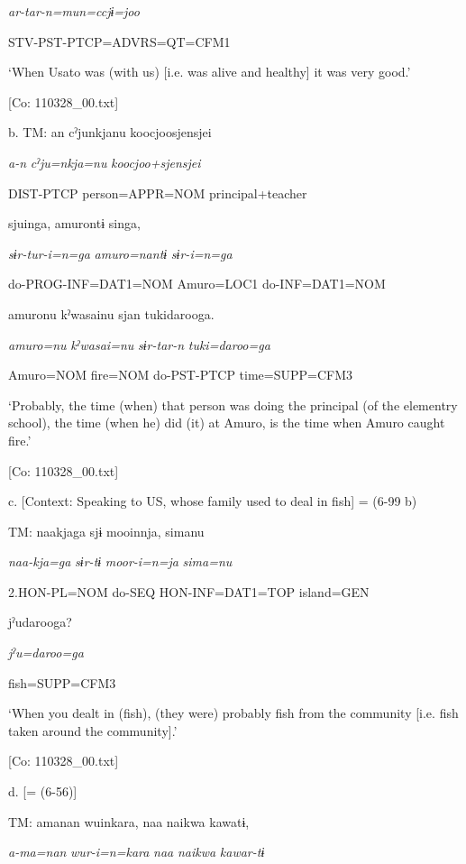       \textit{ar-tar-n=mun=ccjɨ=joo}

      STV-PST-PTCP=ADVRS=QT=CFM1

      ‘When Usato was (with us) [i.e. was alive and healthy] it was very good.’

      [Co: 110328\_00.txt]

  b.  TM:  an  cˀjunkjanu  {\textbar}koocjoosjensjei{\textbar}

      \textit{a-n}  \textit{cˀju=nkja=nu}  \textit{koocjoo+sjensjei}

      DIST-PTCP  person=APPR=NOM  principal+teacher

      sjuinga,  amurontɨ  singa,

      \textit{sɨr-tur-i=n=ga}  \textit{amuro=nantɨ}  \textit{sɨr-i=n=ga}

      do-PROG-INF=DAT1=NOM  Amuro=LOC1  do-INF=DAT1=NOM

      amuronu  kˀwasainu  sjan  tukidarooga.

      \textit{amuro=nu}  \textit{kˀwasai=nu}  \textit{sɨr-tar-n}  \textit{tuki=daroo=ga}

      Amuro=NOM  fire=NOM  do-PST-PTCP  time=SUPP=CFM3

      ‘Probably, the time (when) that person was doing the principal (of the elementry school), the time (when he) did (it) at Amuro, is the time when Amuro caught fire.’

      [Co: 110328\_00.txt]

  c.  [Context: Speaking to US, whose family used to deal in fish] = (6-99 b)

    TM:  naakjaga  sjɨ  mooinnja,  simanu

      \textit{naa-kja=ga}  \textit{sɨr-tɨ}  \textit{moor-i=n=ja}  \textit{sima=nu}

      2.HON-PL=NOM  do-SEQ  HON-INF=DAT1=TOP  island=GEN

      jˀudarooga?

      \textit{jˀu=daroo=ga}

      fish=SUPP=CFM3

      ‘When you dealt in (fish), (they were) probably fish from the community [i.e. fish taken around the community].’

      [Co: 110328\_00.txt]

  d.  [= (6-56)]

    TM:  amanan  wuinkara,  naa  naikwa  kawatɨ,

      \textit{a-ma=nan}  \textit{wur-i=n=kara}  \textit{naa}  \textit{naikwa}  \textit{kawar-tɨ}

